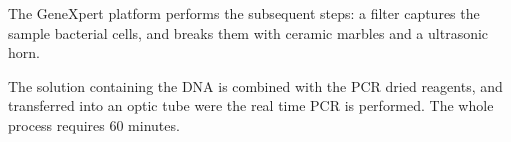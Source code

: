 \documentclass[11pt]{report}
\begin{document}
The GeneXpert platform performs the subsequent steps: a filter captures the sample bacterial cells, and breaks them with ceramic marbles and a ultrasonic horn.

The solution containing the DNA is combined with the PCR dried reagents, and transferred into an optic tube were the real time PCR is performed.
The whole process requires 60 minutes.

 

































\end{document}

